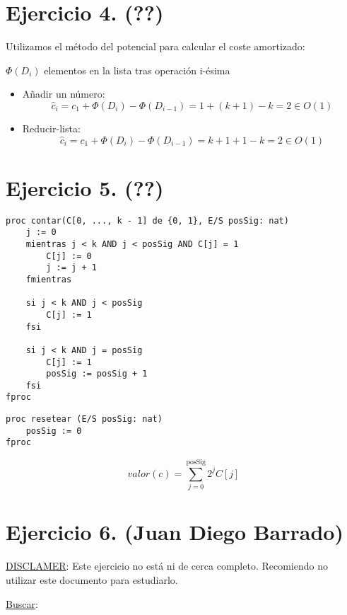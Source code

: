 \documentclass[10pt,a4paper,openright]{book}
\theoremstyle{break}
\begin{document}
\section{Ejercicio 4. (??)}%
\label{sec:ejercicio_4}
Utilizamos el método del potencial para calcular el coste amortizado: 

$\Phi \left( D_i \right)$ elementos en la lista tras operación i-ésima
\begin{itemize}
    \item Añadir un número: 
    \[
    \hat{c}_i = c_1 + \Phi\left( D_i \right) - \Phi\left( D_{i-1} \right) = 1 + \left( k + 1 \right) - k = 2 \in O\left( 1 \right)
    \]
    \item Reducir-lista: 
    \[
    \hat{c}_i = c_1 + \Phi\left( D_i \right) - \Phi\left( D_{i-1} \right) = k + 1 + 1 - k = 2 \in O\left( 1 \right)
    \]
\end{itemize}

\section{Ejercicio 5. (??)}%
\label{sec:ejercicio_5}
\begin{lstlisting}
proc contar(C[0, ..., k - 1] de {0, 1}, E/S posSig: nat)
    j := 0
    mientras j < k AND j < posSig AND C[j] = 1
        C[j] := 0
        j := j + 1
    fmientras

    si j < k AND j < posSig
        C[j] := 1
    fsi

    si j < k AND j = posSig
        C[j] := 1
        posSig := posSig + 1
    fsi
fproc
\end{lstlisting}

\begin{lstlisting}
proc resetear (E/S posSig: nat)
    posSig := 0
fproc
\end{lstlisting}
\[
valor\left( c \right) = \sum_{j=0}^{\text{posSig}} 2^jC\left[ j \right]  
\]

\section{Ejercicio 6. (Juan Diego Barrado)}%
\label{sec:ejercicio_6}
\underline{DISCLAMER}: Este ejercicio no está ni de cerca completo. Recomiendo no utilizar este documento para estudiarlo. 


\underline{Buscar}:
\end{document}

